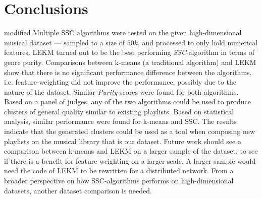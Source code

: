 \documentclass[../report.tex]{subfiles}
\begin{document}
\chapter{Conclusions}
\begin{color}{modified}
  Multiple SSC algorithms were tested on the given high-dimensional musical dataset --- sampled to a size of $50k$, and processed to only hold numerical features. LEKM turned out to be the best performing \textit{SSC}-algorithm in terms of genre purity. Comparisons between k-means (a traditional algorithm) and LEKM show that there is no significant performance difference between the algorithms, i.e. feature-weighting did not improve the performance, possibly due to the nature of the dataset. Similar \textit{Purity} scores were found for both algorithms. Based on a panel of judges, any of the two algorithms could be used to produce clusters of general quality similar to existing playlists. Based on statistical analysis, similar performance were found for k-means and SSC. The results indicate that the generated clusters could be used as a tool when composing new playlists on the musical library that is our dataset. Future work should see a comparison between k-means and LEKM on a larger sample of the dataset, to see if there is a benefit for feature weighting on a larger scale. A larger sample would need the code of LEKM to be rewritten for a distributed network. From a broader perspective on how SSC-algorithms performs on high-dimensional datasets, another dataset comparison is needed.
\end{color}
\end{document}
